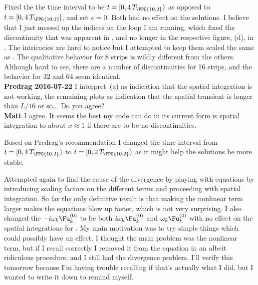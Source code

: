 \begin{description}
{\begin{description}
Fixed the the time interval to be $t = [0, 4\,T_{\PPO{10.2}})$ as opposed
to $t = [0, 4\,T_{\PPO{10.2}}]$, and set $e = 0$. Both had no effect on
the solutions. I believe that I just messed up the indices on the loop I
am running, which fixed the discontinuity that was apparent in
, and no longer in the respective figure, (d), in
. The intricacies are hard to notice but I
attempted to keep them scaled the same as . The
qualitative behavior for 8 strips is wildly different from the others.
Although hard to see, there are a number of discontinuities for 16
strips, and the behavior for 32 and 64 seem identical.
\\
{\bf Predrag 2016-07-22} I interpret
  \,(a) as indication that the spatial
  integration is not working, the remaining plots as indication that the
  spatial transient is longer than $L/16$ or so... Do you agree?
  \\
  {\bf Matt} I agree. It seems the best my code can do
in its current form is spatial integration to about $x \approx 1$ if
there are to be no discontinuities.

Based on Predrag's recommendation I changed the time interval from $t =
[0, 4\,T_{\PPO{10.2}})$ to $t = [0, 2\,T_{\PPO{10.2}})$ as it might help
the solutions be more stable.

\item[KSspaceint]
Attempted again to find the cause of the divergence by playing with
equations  by introducing scaling factors on the different
terms and proceeding with spatial integration. So far the only definitive
result is that making the nonlinear term larger makes the equations blow
up faster, which is not very surprising. I also changed the $- i \omega_k
\Fu^{(0)}_k$ to be both $i \omega_k \Fu^{(0)}_k$ and  $\omega_k
\Fu^{(0)}_k$ with no effect on the spatial integrations for
. My main motivation was to try simple things
which could possibly have an effect. I thought the main problem was the
nonlinear term, but if I recall correctly I removed it from the equation
in an albeit ridiculous procedure, and I still had the divergence
problem. I'll verify this tomorrow because I'm having trouble recalling
if that's actually what I did, but I wanted to write it down to remind
myself.
\end{description}
}


\end{description}
